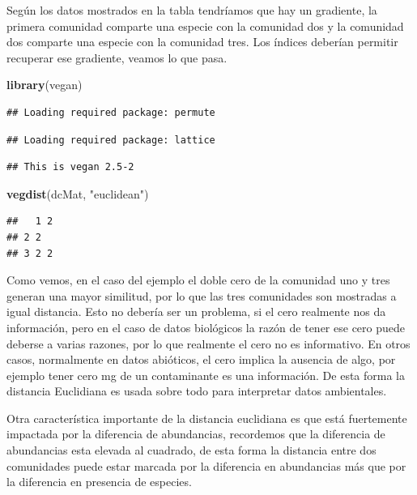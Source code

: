 \documentclass[]{book}
\newenvironment{Shaded}{\begin{snugshade}}{\end{snugshade}}
\newcommand{\KeywordTok}[1]{\textcolor[rgb]{0.13,0.29,0.53}{\textbf{{#1}}}}
\newcommand{\StringTok}[1]{\textcolor[rgb]{0.31,0.60,0.02}{{#1}}}
\newcommand{\NormalTok}[1]{{#1}}
\begin{document}
Según los datos mostrados en la tabla tendríamos que hay un gradiente,
la primera comunidad comparte una especie con la comunidad dos y la
comunidad dos comparte una especie con la comunidad tres. Los índices
deberían permitir recuperar ese gradiente, veamos lo que pasa.

\begin{Shaded}
\begin{Highlighting}[]
\KeywordTok{library}\NormalTok{(vegan)}
\end{Highlighting}
\end{Shaded}

\begin{verbatim}
## Loading required package: permute
\end{verbatim}

\begin{verbatim}
## Loading required package: lattice
\end{verbatim}

\begin{verbatim}
## This is vegan 2.5-2
\end{verbatim}

\begin{Shaded}
\begin{Highlighting}[]
\KeywordTok{vegdist}\NormalTok{(dcMat, }\StringTok{"euclidean"}\NormalTok{)}
\end{Highlighting}
\end{Shaded}

\begin{verbatim}
##   1 2
## 2 2  
## 3 2 2
\end{verbatim}

Como vemos, en el caso del ejemplo el doble cero de la comunidad uno y
tres generan una mayor similitud, por lo que las tres comunidades son
mostradas a igual distancia. Esto no debería ser un problema, si el cero
realmente nos da información, pero en el caso de datos biológicos la
razón de tener ese cero puede deberse a varias razones, por lo que
realmente el cero no es informativo. En otros casos, normalmente en
datos abióticos, el cero implica la ausencia de algo, por ejemplo tener
cero mg de un contaminante es una información. De esta forma la
distancia Euclidiana es usada sobre todo para interpretar datos
ambientales.

Otra característica importante de la distancia euclidiana es que está
fuertemente impactada por la diferencia de abundancias, recordemos que
la diferencia de abundancias esta elevada al cuadrado, de esta forma la
distancia entre dos comunidades puede estar marcada por la diferencia en
abundancias más que por la diferencia en presencia de especies.
\end{document}
